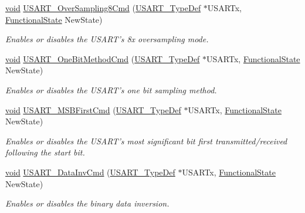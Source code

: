 \begin{DoxyCompactItemize}
\hyperlink{group___n_a_m_e_ga18028b8badbf1ea7e704ccac3c488e82}{void} \hyperlink{group___u_s_a_r_t___group1_ga3897bab07491d9239f8a238a9a7cddea}{U\-S\-A\-R\-T\-\_\-\-Over\-Sampling8\-Cmd} (\hyperlink{struct_u_s_a_r_t___type_def}{U\-S\-A\-R\-T\-\_\-\-Type\-Def} $\ast$U\-S\-A\-R\-Tx, \hyperlink{group___exported__types_gac9a7e9a35d2513ec15c3b537aaa4fba1}{Functional\-State} New\-State)
\begin{DoxyCompactList}\small\item\em Enables or disables the U\-S\-A\-R\-T's 8x oversampling mode. \end{DoxyCompactList}\item 
\hyperlink{group___n_a_m_e_ga18028b8badbf1ea7e704ccac3c488e82}{void} \hyperlink{group___u_s_a_r_t___group1_ga3ed89ea8765d851510cfe90f7d90cbbb}{U\-S\-A\-R\-T\-\_\-\-One\-Bit\-Method\-Cmd} (\hyperlink{struct_u_s_a_r_t___type_def}{U\-S\-A\-R\-T\-\_\-\-Type\-Def} $\ast$U\-S\-A\-R\-Tx, \hyperlink{group___exported__types_gac9a7e9a35d2513ec15c3b537aaa4fba1}{Functional\-State} New\-State)
\begin{DoxyCompactList}\small\item\em Enables or disables the U\-S\-A\-R\-T's one bit sampling method. \end{DoxyCompactList}\item 
\hyperlink{group___n_a_m_e_ga18028b8badbf1ea7e704ccac3c488e82}{void} \hyperlink{group___u_s_a_r_t___group1_ga212fde29c4c163bdf4c827fd8018f8c4}{U\-S\-A\-R\-T\-\_\-\-M\-S\-B\-First\-Cmd} (\hyperlink{struct_u_s_a_r_t___type_def}{U\-S\-A\-R\-T\-\_\-\-Type\-Def} $\ast$U\-S\-A\-R\-Tx, \hyperlink{group___exported__types_gac9a7e9a35d2513ec15c3b537aaa4fba1}{Functional\-State} New\-State)
\begin{DoxyCompactList}\small\item\em Enables or disables the U\-S\-A\-R\-T's most significant bit first transmitted/received following the start bit. \end{DoxyCompactList}\item 
\hyperlink{group___n_a_m_e_ga18028b8badbf1ea7e704ccac3c488e82}{void} \hyperlink{group___u_s_a_r_t___group1_gaa0e509eecf7aa77056ffb9d1a46c2a33}{U\-S\-A\-R\-T\-\_\-\-Data\-Inv\-Cmd} (\hyperlink{struct_u_s_a_r_t___type_def}{U\-S\-A\-R\-T\-\_\-\-Type\-Def} $\ast$U\-S\-A\-R\-Tx, \hyperlink{group___exported__types_gac9a7e9a35d2513ec15c3b537aaa4fba1}{Functional\-State} New\-State)
\begin{DoxyCompactList}\small\item\em Enables or disables the binary data inversion. \end{DoxyCompactList}\item 

\end{DoxyCompactItemize}
